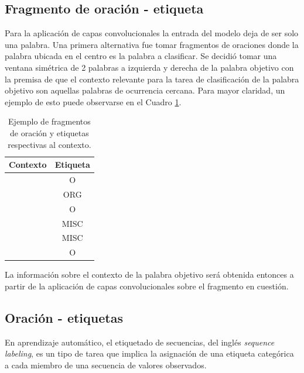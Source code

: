 \subsection{Fragmento de oración - etiqueta}\label{sec:fragmento_sentencia}

Para la aplicación de capas convolucionales la entrada del modelo deja de ser solo una palabra. Una primera alternativa fue tomar fragmentos de oraciones donde la palabra ubicada en el centro es la palabra a clasificar. Se decidió tomar una ventana simétrica de 2 palabras a izquierda y derecha de la palabra objetivo con la premisa de que el contexto relevante para la tarea de clasificación de la palabra objetivo son aquellas palabras de ocurrencia cercana. Para mayor claridad, un ejemplo de esto puede observarse en el Cuadro \ref{tab:fragmento:oracion}.

\begin{table}[ht]
    \centering
    \begin{tabular}{|l|c|}
        \hline
        \textbf{Contexto} & \textbf{Etiqueta} \\
        \hline
        ['It', 'aired', '\textbf{on}', 'NBC', 'from'] & O \\ & ORG \\ & O \\ & MISC \\ & MISC \\ & O \\
        \hline
    \end{tabular}
    \caption{Ejemplo de fragmentos de oración y etiquetas respectivas al contexto.}
    \label{tab:fragmento:oracion}
\end{table}

La información sobre el contexto de la palabra objetivo será obtenida entonces a partir de la aplicación de capas convolucionales sobre el fragmento en cuestión.

\subsection{Oración - etiquetas}\label{sec:sequence_labeling}

En aprendizaje automático, el etiquetado de secuencias, del inglés \textit{sequence labeling}, es un tipo de tarea que implica la asignación de una etiqueta categórica a cada miembro de una secuencia de valores observados.

